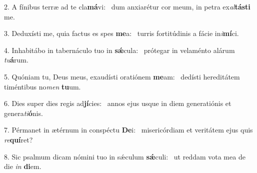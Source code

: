 2. A fínibus terræ ad te cla\textbf{má}vi: \ast\  dum anxiarétur cor meum, in petra ex\textit{al}\textbf{tás}\textbf{ti} me.\

3. Deduxísti me, quia factus es spes \textbf{me}a: \ast\  turris fortitúdinis a fácie in\textit{i}\textbf{mí}ci.\

4. Inhabitábo in tabernáculo tuo in \textbf{sǽ}cula: \ast\  prótegar in velaménto alárum \textit{tu}\textbf{á}rum.\

5. Quóniam tu, Deus meus, exaudísti oratiónem \textbf{me}am: \ast\  dedísti hereditátem timéntibus no\textit{men} \textbf{tu}um.\

6. Dies super dies regis ad\textbf{jí}cies: \ast\  annos ejus usque in diem generatiónis et genera\textit{ti}\textbf{ó}nis.\

7. Pérmanet in ætérnum in conspéctu \textbf{De}i: \ast\  misericórdiam et veritátem ejus quis \textit{re}\textbf{quí}ret?\

8. Sic psalmum dicam nómini tuo in sǽculum \textbf{sǽ}culi: \ast\  ut reddam vota mea de die \textit{in} \textbf{di}em.\

